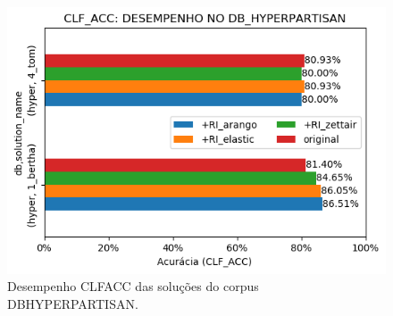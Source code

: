 \begin{figure}[ht]
    \centering
    \caption{Desempenho CLF\underscore{}ACC das soluções do corpus DB\underscore{}HYPERPARTISAN.}
    \vspace{-0.5cm}
    \begin{center}
        \includegraphics[scale=0.75]{img/clf-acc-bars-hyperpartisan.png}
    \end{center}
    \vspace{-0.5cm}
    \label{fig:clf-acc-bars-hyperpartisan}
\end{figure}